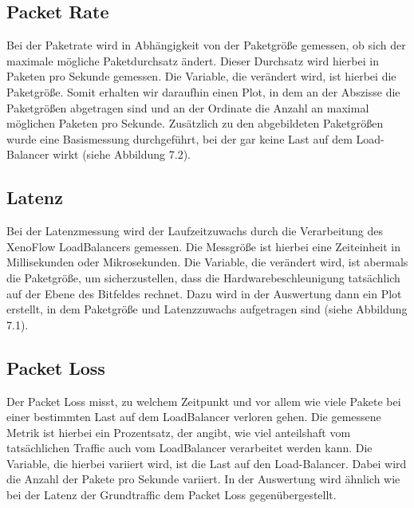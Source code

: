 \subsection{Packet Rate}
Bei der Paketrate wird in Abhängigkeit von der Paketgröße gemessen, ob sich der maximale mögliche Paketdurchsatz ändert. Dieser Durchsatz wird hierbei in Paketen pro Sekunde gemessen. Die Variable, die verändert wird, ist hierbei die Paketgröße. Somit erhalten wir daraufhin einen Plot, in dem an der Abszisse die Paketgrößen abgetragen sind und an der Ordinate die Anzahl an maximal möglichen Paketen pro Sekunde. Zusätzlich zu den abgebildeten Paketgrößen wurde eine Basismessung durchgeführt, bei der gar keine Last auf dem Load-Balancer wirkt (siehe Abbildung 7.2).
\subsection{Latenz}
Bei der Latenzmessung wird der Laufzeitzuwachs durch die Verarbeitung des XenoFlow LoadBalancers gemessen. Die Messgröße ist hierbei eine Zeiteinheit in Millisekunden oder Mikrosekunden. Die Variable, die verändert wird, ist abermals die Paketgröße, um sicherzustellen, dass die Hardwarebeschleunigung tatsächlich auf der Ebene des Bitfeldes rechnet. Dazu wird in der Auswertung dann ein Plot erstellt, in dem Paketgröße und Latenzzuwachs aufgetragen sind (siehe Abbildung 7.1).
\subsection{Packet Loss}
Der Packet Loss misst, zu welchem Zeitpunkt und vor allem wie viele Pakete bei einer bestimmten Last auf dem LoadBalancer verloren gehen. Die gemessene Metrik ist hierbei ein Prozentsatz, der angibt, wie viel anteilshaft vom tatsächlichen Traffic auch vom LoadBalancer verarbeitet werden kann. Die Variable, die hierbei variiert wird, ist die Last auf den Load-Balancer. Dabei wird die Anzahl der Pakete pro Sekunde variiert. In der Auswertung wird ähnlich wie bei der Latenz der Grundtraffic dem Packet Loss gegenübergestellt.
